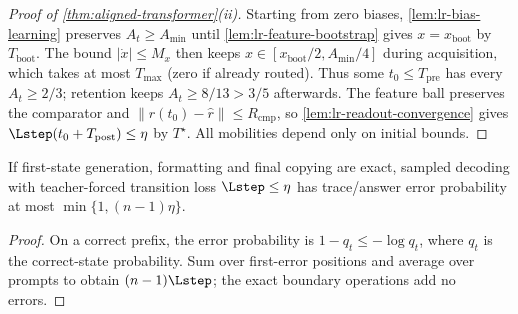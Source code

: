 \begin{proof}[Proof of \cref{thm:aligned-transformer}(ii)]
Starting from zero biases, \cref{lem:lr-bias-learning} preserves
$A_t\ge A_{\min}$ until \cref{lem:lr-feature-bootstrap} gives
$x=x_{\mathrm{boot}}$ by $T_{\mathrm{boot}}$.
The bound $|\dot x|\le M_x$ then keeps $x\in[x_{\mathrm{boot}}/2,A_{\min}/4]$
during acquisition, which takes at most $T_{\max}$ (zero if already routed).
Thus some $t_0\le T_{\mathrm{pre}}$ has every $A_t\ge2/3$;
retention keeps $A_t\ge8/13>3/5$ afterwards.
The feature ball preserves the comparator and
$\|r(t_0)-\widehat r\|\le R_{\mathrm{cmp}}$, so
\cref{lem:lr-readout-convergence} gives
$\Lstep(t_0+T_{\mathrm{post}})\le\eta$ by $T^\star$.
All mobilities depend only on initial bounds.
\end{proof}

\begin{corollary}
\label{cor:conditional-rollout}
If first-state generation, formatting and final copying are exact,
sampled decoding with teacher-forced transition loss $\Lstep\le\eta$
has trace/answer error probability at most $\min\{1,(n-1)\eta\}$.
\end{corollary}
\begin{proof}
On a correct prefix, the error probability is $1-q_t\le-\log q_t$, where
$q_t$ is the correct-state probability. Sum over first-error positions and
average over prompts to obtain $(n-1)\Lstep$; the exact boundary operations
add no errors.
\end{proof}
